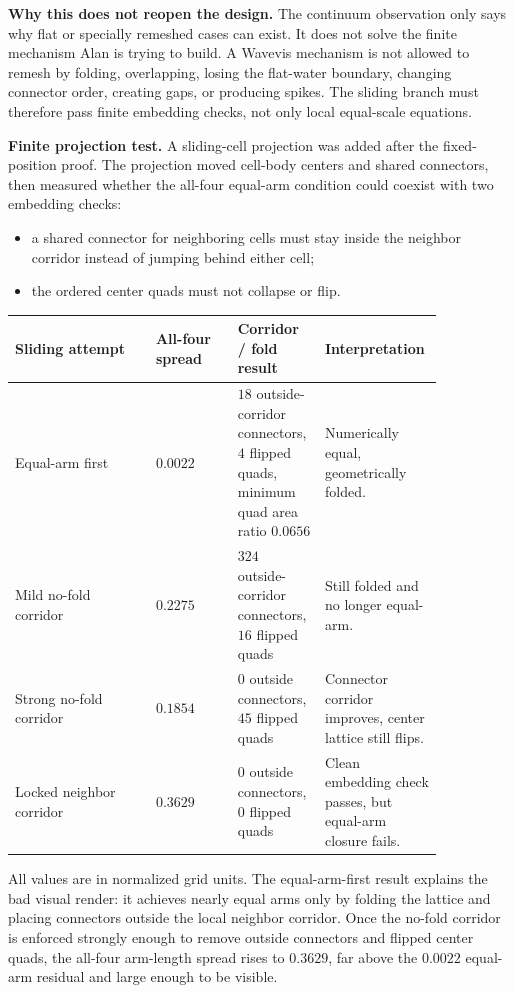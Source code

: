 \documentclass[11pt,letterpaper]{article}
\begin{document}
\textbf{Why this does not reopen the design.} The continuum observation only says why flat or specially remeshed cases can exist. It does not solve the finite mechanism Alan is trying to build. A Wavevis mechanism is not allowed to remesh by folding, overlapping, losing the flat-water boundary, changing connector order, creating gaps, or producing spikes. The sliding branch must therefore pass finite embedding checks, not only local equal-scale equations.

\textbf{Finite projection test.} A sliding-cell projection was added after the fixed-position proof. The projection moved cell-body centers and shared connectors, then measured whether the all-four equal-arm condition could coexist with two embedding checks:
\begin{itemize}
  \item a shared connector for neighboring cells must stay inside the neighbor corridor instead of jumping behind either cell;
  \item the ordered center quads must not collapse or flip.
\end{itemize}

\begin{center}
\begin{tabular}{Y{0.31\linewidth}Y{0.18\linewidth}Y{0.18\linewidth}Y{0.18\linewidth}}
\toprule
Sliding attempt & All-four spread & Corridor / fold result & Interpretation \\
\midrule
Equal-arm first & \(0.0022\) & \(18\) outside-corridor connectors, \(4\) flipped quads, minimum quad area ratio \(0.0656\) & Numerically equal, geometrically folded. \\
Mild no-fold corridor & \(0.2275\) & \(324\) outside-corridor connectors, \(16\) flipped quads & Still folded and no longer equal-arm. \\
Strong no-fold corridor & \(0.1854\) & \(0\) outside connectors, \(45\) flipped quads & Connector corridor improves, center lattice still flips. \\
Locked neighbor corridor & \(0.3629\) & \(0\) outside connectors, \(0\) flipped quads & Clean embedding check passes, but equal-arm closure fails. \\
\bottomrule
\end{tabular}
\end{center}

All values are in normalized grid units. The equal-arm-first result explains the bad visual render: it achieves nearly equal arms only by folding the lattice and placing connectors outside the local neighbor corridor. Once the no-fold corridor is enforced strongly enough to remove outside connectors and flipped center quads, the all-four arm-length spread rises to \(0.3629\), far above the \(0.0022\) equal-arm residual and large enough to be visible.
\end{document}
